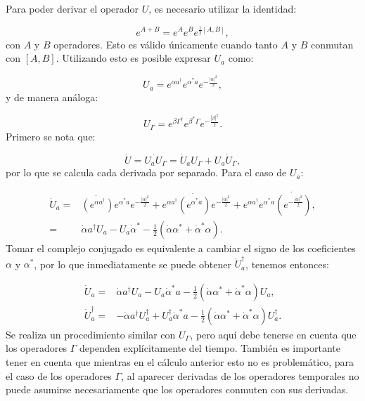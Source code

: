 \documentclass[a4paper,10pt]{report}
\begin{document}
Para poder derivar el operador $U$, es necesario utilizar la identidad:

\begin{equation}
e^{A+B} = e^A e^B e^{\frac{1}{2}[A,B]},
\end{equation} con $A$ y $B$ operadores. Esto es válido únicamente cuando tanto $A$ y $B$ conmutan con $[A,B]$. Utilizando esto es posible expresar $U_a$ como:

\begin{equation}
U_a = e^{\alpha a^\dagger}e^{\alpha^* a}e^{-\frac{|\alpha|^2}{2}},
\end{equation} y de manera análoga:

\begin{equation}
U_\Gamma = e^{\beta \Gamma^\dagger}e^{\beta^* \Gamma}e^{-\frac{|\beta|^2}{2}}.
\end{equation} Primero se nota que:

\begin{equation}
\dot{U} = \dot{U_aU_\Gamma} = \dot{U}_a U_\Gamma +  U_a \dot{U}_\Gamma,
\end{equation} por lo que se calcula cada derivada por separado. Para el caso de $U_a$:

\begin{align*}
\dot{U}_a =& \dot{(e^{\alpha a^\dagger})}e^{\alpha^* a}e^{-\frac{|\alpha|^2}{2}}
+e^{\alpha a^\dagger}\dot{(e^{\alpha^* a})}e^{-\frac{|\alpha|^2}{2}}+e^{\alpha a^\dagger}e^{\alpha^* a}\dot{(e^{-\frac{|\alpha|^2}{2}})},\\
=&\dot{\alpha} a^\dagger U_a - U_a\dot{\alpha}^* - \frac{1}{2}(\dot{\alpha} \alpha^*+\dot{\alpha}^* \alpha).
\end{align*} Tomar el complejo conjugado es equivalente a cambiar el signo de los coeficientes $\alpha$ y $\alpha^*$, por lo que inmediatamente se puede obtener $\dot{U}_a^\dagger$, tenemos entonces:

\begin{align}
\dot{U}_a=&\dot{\alpha} a^\dagger U_a - U_a\dot{\alpha}^*a - \frac{1}{2}(\dot{\alpha} \alpha^*+\dot{\alpha}^* \alpha)U_a,\\
\dot{U}_a^\dagger=&-\dot{\alpha} a^\dagger U_a^\dagger + U_a^\dagger\dot{\alpha}^*a - \frac{1}{2}(\dot{\alpha} \alpha^*+\dot{\alpha}^* \alpha)U_a^\dagger.
\end{align} Se realiza un procedimiento similar con $U_\Gamma$, pero aquí debe tenerse en cuenta que los operadores $\Gamma$ dependen explícitamente del tiempo. También es importante tener en cuenta que mientras en el cálculo anterior esto no es problemático, para el caso de los operadores $\Gamma$, al aparecer derivadas de los operadores temporales no puede asumirse necesariamente que los operadores conmuten con sus derivadas. 
\end{document}
